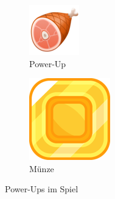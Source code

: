 \begin{figure}[H]
    \centering
    \begin{subfigure}[H]{0.15\textwidth}
        \includegraphics[width=\textwidth]{img/realisierung/assets/eat}
        \caption{Power-Up}
        \label{fig:eat}
    \end{subfigure}
    \qquad
    \begin{subfigure}[H]{0.15\textwidth}
        \includegraphics[width=\textwidth]{img/realisierung/assets/coin}
        \caption{Münze}
        \label{fig:coin}
    \end{subfigure}
    \caption{Power-Ups im Spiel}
    \label{fig:eatandcoin}
\end{figure}

